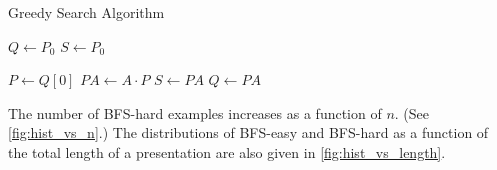 \begin{algorithm}
	\caption{Greedy Search Algorithm}\label{alg:bfs}
	\begin{algorithmic}
		\State $Q \gets P_0$ 
		\State $S \gets P_0$ 

		 
		\State $P \gets Q[0]$ 
		\State $PA \gets A \cdot P$ 
		\State $S \gets PA$
		\State $Q \gets PA$ 

		\EndIf
		\EndFor
		\EndWhile
	\end{algorithmic}
\end{algorithm}



The number of BFS-hard examples increases as a function of $n$.
(See \autoref{fig:hist_vs_n}.)
The distributions of BFS-easy and BFS-hard as a function of the total length of a presentation are also given in \autoref{fig:hist_vs_length}.

